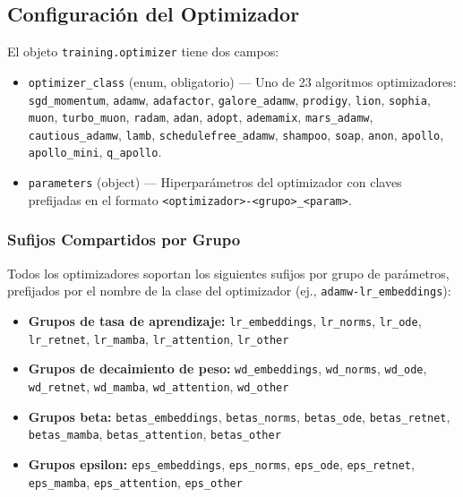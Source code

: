 \subsection{Configuración del Optimizador}
\label{subsec:optimizer-config}

El objeto \texttt{training.optimizer} tiene dos campos:

\begin{itemize}[nosep]
    \item \texttt{optimizer\_class} (enum, obligatorio) --- Uno de 23 algoritmos optimizadores: \texttt{sgd\_momentum}, \texttt{adamw}, \texttt{adafactor}, \texttt{galore\_adamw}, \texttt{prodigy}, \texttt{lion}, \texttt{sophia}, \texttt{muon}, \texttt{turbo\_muon}, \texttt{radam}, \texttt{adan}, \texttt{adopt}, \texttt{ademamix}, \texttt{mars\_adamw}, \texttt{cautious\_adamw}, \texttt{lamb}, \texttt{schedulefree\_adamw}, \texttt{shampoo}, \texttt{soap}, \texttt{anon}, \texttt{apollo}, \texttt{apollo\_mini}, \texttt{q\_apollo}.
    \item \texttt{parameters} (object) --- Hiperparámetros del optimizador con claves prefijadas en el formato \texttt{<optimizador>-<grupo>\_<param>}.
\end{itemize}

\subsubsection{Sufijos Compartidos por Grupo}

Todos los optimizadores soportan los siguientes sufijos por grupo de parámetros, prefijados por el nombre de la clase del optimizador (ej., \texttt{adamw-lr\_embeddings}):

\begin{itemize}[nosep]
    \item \textbf{Grupos de tasa de aprendizaje:} \texttt{lr\_embeddings}, \texttt{lr\_norms}, \texttt{lr\_ode}, \texttt{lr\_retnet}, \texttt{lr\_mamba}, \texttt{lr\_attention}, \texttt{lr\_other}
    \item \textbf{Grupos de decaimiento de peso:} \texttt{wd\_embeddings}, \texttt{wd\_norms}, \texttt{wd\_ode}, \texttt{wd\_retnet}, \texttt{wd\_mamba}, \texttt{wd\_attention}, \texttt{wd\_other}
    \item \textbf{Grupos beta:} \texttt{betas\_embeddings}, \texttt{betas\_norms}, \texttt{betas\_ode}, \texttt{betas\_retnet}, \texttt{betas\_mamba}, \texttt{betas\_attention}, \texttt{betas\_other}
    \item \textbf{Grupos epsilon:} \texttt{eps\_embeddings}, \texttt{eps\_norms}, \texttt{eps\_ode}, \texttt{eps\_retnet}, \texttt{eps\_mamba}, \texttt{eps\_attention}, \texttt{eps\_other}
\end{itemize}

